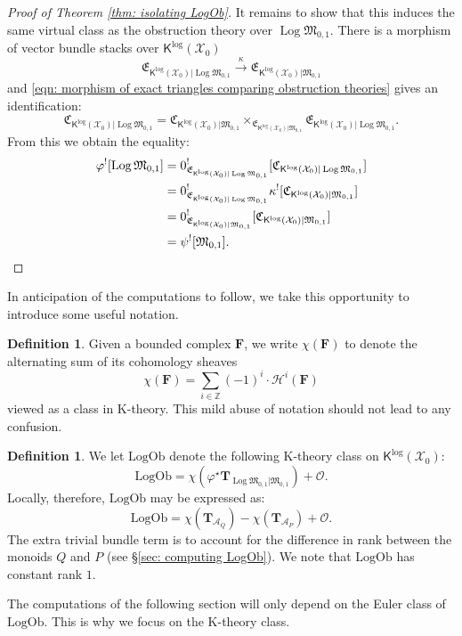 \documentclass[11pt]{amsart}
\theoremstyle{definition}
\theoremstyle{definition}
\newtheorem{definition}[theorem]{Definition}
\newcommand{\TT}{\mathbf{T}}
\newcommand{\OO}{\mathcal{O}}
\newcommand{\HH}{\mathcal{H}}
\newcommand{\LogOb}{\mathrm{LogOb}}
\newcommand{\Acal}{\mathcal{A}}
\newcommand{\Xcal}{\mathcal{X}}
\newcommand{\Mfrak}{\mathfrak{M}}
\newcommand{\Kup}{\mathsf{K}}
\newcommand{\Log}{\operatorname{Log}}
\newcommand{\FF}{\mathbf{F}}
\begin{document}
\begin{proof}[Proof of Theorem \ref{thm: isolating LogOb}]
It remains to show that this induces the same virtual class as the obstruction theory over $\Log\Mfrak_{0,1}$. There is a morphism of vector bundle stacks over $\Kup^{\log}(\Xcal_0)$
\[ \mathfrak{E}_{\Kup^{\log}(\Xcal_0)|\Log\Mfrak_{0,1}} \xrightarrow{\kappa} \mathfrak{E}_{\Kup^{\log}(\Xcal_0)|\Mfrak_{0,1}}\]
and \eqref{eqn: morphism of exact triangles comparing obstruction theories} gives an identification:
\[ \mathfrak{C}_{\Kup^{\log}(\Xcal_0)|\Log\Mfrak_{0,1}} = \mathfrak{C}_{\Kup^{\log}(\Xcal_0)|\Mfrak_{0,1}} \times_{\mathfrak{E}_{\Kup^{\log}(\Xcal_0)|\Mfrak_{0,1}}} \mathfrak{E}_{\Kup^{\log}(\Xcal_0)|\Log\Mfrak_{0,1}}.\]
From this we obtain the equality:
\begin{align*}
	\varphi^![\Log\Mfrak_{0,1}] & = 0^!_{\mathfrak{E}_{\Kup^{\log}(\Xcal_0)|\Log\Mfrak_{0,1}}}[\mathfrak{C}_{\Kup^{\log}(\Xcal_0)|\Log\Mfrak_{0,1}}] \\
	& = 0^!_{\mathfrak{E}_{\Kup^{\log}(\Xcal_0)|\Log\Mfrak_{0,1}}} \kappa^! [\mathfrak{C}_{\Kup^{\log}(\Xcal_0)|\Mfrak_{0,1}}] \\
	& = 0^!_{\mathfrak{E}_{\Kup^{\log}(\Xcal_0)|\Mfrak_{0,1}}}[\mathfrak{C}_{\Kup^{\log}(\Xcal_0)|\Mfrak_{0,1}}] \\
	& = \psi^![\Mfrak_{0,1}].\qedhere
\end{align*}
\end{proof}

In anticipation of the computations to follow, we take this opportunity to introduce some useful notation.
\begin{definition}Given a bounded complex $\FF$, we write $\chi(\FF)$ to denote the alternating sum of its cohomology sheaves
\begin{equation*} \chi(\FF) = \sum_{i \in \mathbb{Z}} (-1)^i \cdot \HH^i(\FF) \end{equation*}	
viewed as a class in K-theory. This mild abuse of notation should not lead to any confusion.
\end{definition}

\begin{definition}\label{def: LogOb} We let $\LogOb$ denote the following K-theory class on $\Kup^{\log}(\Xcal_0)$:
\begin{equation*} \LogOb = \chi(\varphi^\star \TT_{\Log\Mfrak_{0,1}|\Mfrak_{0,1}}) + \OO.\end{equation*}
Locally, therefore, $\LogOb$ may be expressed as:
\begin{equation}\label{eqn: basic formula for LogOb} \LogOb = \chi(\TT_{\Acal_Q}) - \chi(\TT_{\Acal_P}) + \OO.\end{equation}
The extra trivial bundle term is to account for the difference in rank between the monoids $Q$ and $P$ (see \S \ref{sec: computing LogOb}). We note that $\LogOb$ has constant rank $1$.\end{definition}
The computations of the following section will only depend on the Euler class of $\LogOb$. This is why we focus on the K-theory class.
\end{document}
